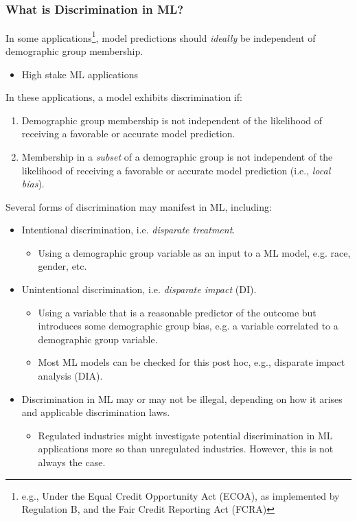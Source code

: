 \documentclass[11pt,
               		aspectratio=169,
               		hyperref={colorlinks}
               		]{beamer}
\begin{document}
		\subsection*{}
		\begin{frame}				
			\frametitle{What is Discrimination in ML?}
			\scriptsize			
			\noindent In some applications\footnote{\tiny{e.g., Under the Equal Credit Opportunity Act (ECOA), as implemented by Regulation B, and the Fair Credit Reporting Act (FCRA})}, model predictions should \textit{ideally} be independent of demographic group membership.\\
			  \begin{itemize}
			    \item \tiny{High stake ML applications}
			  \end{itemize}
			\vspace{5pt}
			\noindent In these applications, a model exhibits discrimination if:
			\begin{enumerate}
				\item \tiny{Demographic group membership is not independent of the likelihood of receiving a favorable or accurate model prediction.}
				\item \tiny{Membership in a \textit{subset} of a demographic group is not independent of the likelihood of receiving a favorable or accurate model prediction (i.e., \textit{local bias}).\cite{hall2019guidelines}}
			\end{enumerate}
			\noindent Several forms of discrimination may manifest in ML, including:
			\begin{itemize}
				\item Intentional discrimination, i.e. \textit{disparate treatment}.
				 \begin{itemize}
				  \item \tiny{Using a demographic group variable as an input to a ML model, e.g. race, gender, etc.} 
				 \end{itemize}
				\item Unintentional discrimination, i.e. \textit{disparate impact} (DI).
				 \begin{itemize}
				  \item \tiny{Using a variable that is a reasonable predictor of the outcome but introduces some demographic group bias, e.g. a variable correlated to a demographic group variable.} 
				  \item \tiny{Most ML models can be checked for this post hoc, e.g., disparate impact analysis (DIA).}
				 \end{itemize}
				\item Discrimination in ML may or may not be illegal, depending on how it arises and applicable discrimination laws.\cite{hall2019guidelines}
				  \begin{itemize}
				    \item \tiny{Regulated industries might investigate potential discrimination in ML applications more so than unregulated industries. However, this is not always the case.}
				  \end{itemize}
			\end{itemize}
		\end{frame}		
\end{document}
